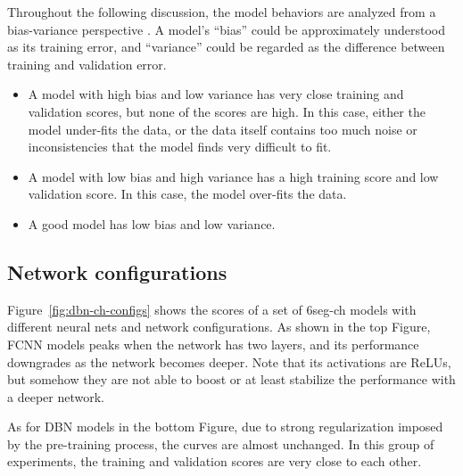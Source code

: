 Throughout the following discussion, the model behaviors are analyzed from a bias-variance perspective \cite{geman1992neural}. A model's ``bias'' could be approximately understood as its training error, and ``variance'' could be regarded as the difference between training and validation error.
\begin{itemize}
	\item A model with high bias and low variance has very close training and validation scores, but none of the scores are high. In this case, either the model under-fits the data, or the data itself contains too much noise or inconsistencies that the model finds very difficult to fit.
	\item A model with low bias and high variance has a high training score and low validation score. In this case, the model over-fits the data.
	\item A good model has low bias and low variance.
\end{itemize}

\subsection{Network configurations} \label{sec:3-p2}

Figure~\ref{fig:dbn-ch-configs} shows the scores of a set of 6seg-ch models with different neural nets and network configurations. As shown in the top Figure, FCNN models peaks when the network has two layers, and its performance downgrades as the network becomes deeper. Note that its activations are ReLUs, but somehow they are not able to boost or at least stabilize the performance with a deeper network.

As for DBN models in the bottom Figure, due to strong regularization imposed by the pre-training process, the curves are almost unchanged. In this group of experiments, the training and validation scores are very close to each other.

